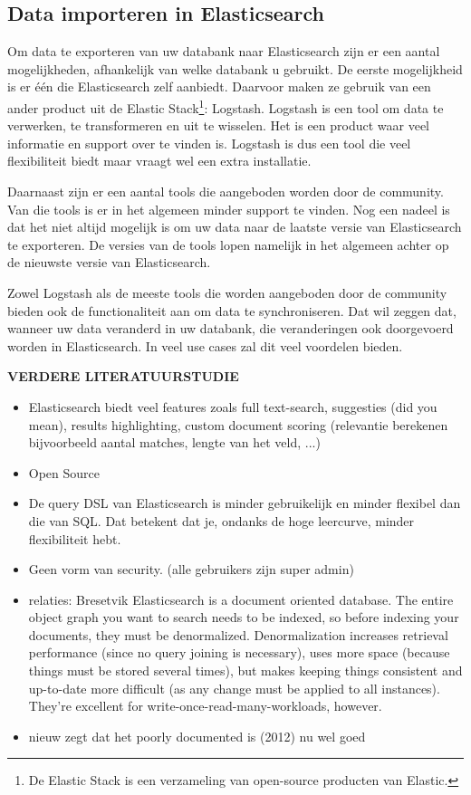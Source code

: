 \subsection{Data importeren in Elasticsearch}

Om data te exporteren van uw databank naar Elasticsearch zijn er een aantal mogelijkheden, afhankelijk van welke databank u gebruikt. De eerste mogelijkheid is er één die Elasticsearch zelf aanbiedt. Daarvoor maken ze gebruik van een ander product uit de Elastic Stack\footnote{De Elastic Stack is een verzameling van open-source producten van Elastic.}: Logstash. Logstash is een tool om data te verwerken, te transformeren en uit te wisselen. Het is een product waar veel informatie en support over te vinden is. Logstash is dus een tool die veel flexibiliteit biedt maar vraagt wel een extra installatie. 

Daarnaast zijn er een aantal tools die aangeboden worden door de community. Van die tools is er in het algemeen minder support te vinden. Nog een nadeel is dat het niet altijd mogelijk is om uw data naar de laatste versie van Elasticsearch te exporteren. De versies van de tools lopen namelijk in het algemeen achter op de nieuwste versie van Elasticsearch. 

Zowel Logstash als de meeste tools die worden aangeboden door de community bieden ook de functionaliteit aan om data te synchroniseren. Dat wil zeggen dat, wanneer uw data veranderd in uw databank, die veranderingen ook doorgevoerd worden in Elasticsearch. In veel use cases zal dit veel voordelen bieden. 

\textbf{VERDERE LITERATUURSTUDIE}

\begin{itemize}
	\item Elasticsearch biedt veel features zoals full text-search, suggesties (did you mean), results highlighting, custom document scoring (relevantie berekenen bijvoorbeeld aantal matches, lengte van het veld, ...) 
	\item Open Source
	\item De query DSL van Elasticsearch is minder gebruikelijk en minder flexibel dan die van SQL. Dat betekent dat je, ondanks de hoge leercurve, minder flexibiliteit hebt.  
	\item Geen vorm van security. (alle gebruikers zijn super admin) 
	\item relaties: Bresetvik Elasticsearch is a document oriented database. The entire object graph you want to search needs to be indexed, so before indexing your documents, they must be denormalized. Denormalization increases retrieval performance (since no query joining is necessary), uses more space (because things must be stored several times), but makes keeping things consistent and up-to-date more difficult (as any change must be applied to all instances). They're excellent for write-once-read-many-workloads, however.
	\item nieuw zegt dat het poorly documented is (2012) nu wel goed
\end{itemize}




